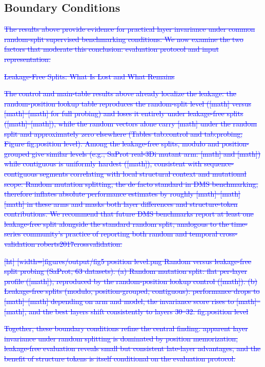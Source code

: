 \documentclass[11pt,a4paper]{article}
\begin{document}
\subsection{Boundary Conditions}

\textcolor{blue}{\sout{The results above provide evidence for practical layer invariance under common
random-split supervised benchmarking conditions. We now examine the two
factors that moderate this conclusion: evaluation protocol and input
representation.}}

\textcolor{blue}{\sout{Leakage-Free Splits: What Is Lost and What Remains}}

\textcolor{blue}{\sout{The control and main-table results above already localize the leakage: the
random-position lookup table reproduces the random-split level ([math] versus
[math]--[math] for full probing) and loses it entirely under leakage-free splits
([math]--[math]), while the random vectors alone carry [math] under the random
split and approximately zero elsewhere (Tables tab:control
and tab:probing; Figure fig:position level). Among the leakage-free
splits, modulo and position-grouped give similar levels (e.g., SaProt real-3Di
mutant arm: [math] and [math]) while contiguous is uniformly hardest ([math]),
consistent with sequence-contiguous segments correlating with local structural
context and mutational scope. Random mutation splitting, the de facto standard in DMS
benchmarking, therefore inflates absolute performance estimates by roughly
[math]--[math] [math] in these arms and masks both layer differences and
structure-token contributions. We recommend that future DMS benchmarks report at
least one leakage-free split alongside the standard random split, analogous to the
time-series community's practice of reporting both random and temporal
cross-validation roberts2017crossvalidation.}}

\textcolor{blue}{\sout{[ht]
[width=]figures/output/fig5 position level.png
Random versus leakage-free split probing (SaProt, 63 datasets).
(a) Random mutation split: flat per-layer profile
([math]), reproduced by the random-position lookup control
([math]). (b)
Leakage-free splits (modulo, position-grouped, contiguous): performance
drops to [math]--[math] depending on arm and model, the invariance score rises to
[math]--[math], and the best layers shift consistently to layers 30--32.
fig:position level}}

\textcolor{blue}{\sout{Together, these boundary conditions refine the central finding: apparent
layer invariance under random splitting is dominated by position memorization,
leakage-free evaluation reveals small but consistent late-layer advantages, and the
benefit of structure tokens is itself conditional on the evaluation protocol.}}
\end{document}
